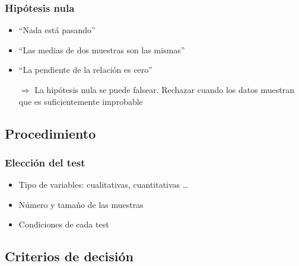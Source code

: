 \documentclass[gray,handout,mathserif]{beamer}
\begin{document}
\begin{frame}[label=null]
\frametitle{Hip\'otesis nula}
 \begin{itemize}[<+-| handout:1>]
   \item ``Nada est\'a pasando''
   \item ``Las medias de dos muestras son las mismas'' 
   \item ``La pendiente de la relaci\'on es cero''
\end{itemize}
\medskip
\begin{itemize}[<+-| handout:1>]
\item[$\Rightarrow$] La hip\'otesis nula \alert{se puede falsear}. Rechazar cuando los datos muestran que es suficientemente improbable
\end{itemize}
\end{frame}%


\subsection[Procedimiento]{Procedimiento}

\begin{frame}[label=testchoice]
   \frametitle{Elecci\'on del test}
   \begin{itemize}
      \item Tipo de variables: cualitativas, cuantitativas \ldots
      \item N\'umero y tama\~no de las muestras
      \item Condiciones de cada test
   \end{itemize}
\end{frame}%


\subsection[Decisi\'on]{Criterios de decisi\'on}
\end{document}
